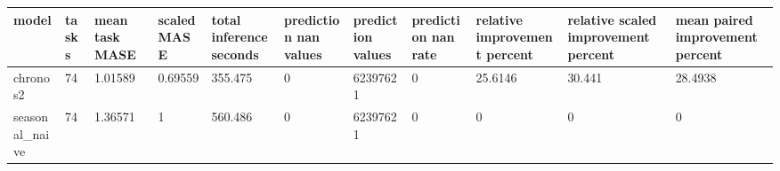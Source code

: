 \begin{tabular}{lllllllllll}
\toprule
model & tasks & mean task MASE & scaled MASE & total inference seconds & prediction nan values & prediction values & prediction nan rate & relative improvement percent & relative scaled improvement percent & mean paired improvement percent \\
\midrule
chronos2 & 74 & 1.01589 & 0.69559 & 355.475 & 0 & 62397621 & 0 & 25.6146 & 30.441 & 28.4938 \\
seasonal\_naive & 74 & 1.36571 & 1 & 560.486 & 0 & 62397621 & 0 & 0 & 0 & 0 \\
\bottomrule
\end{tabular}
